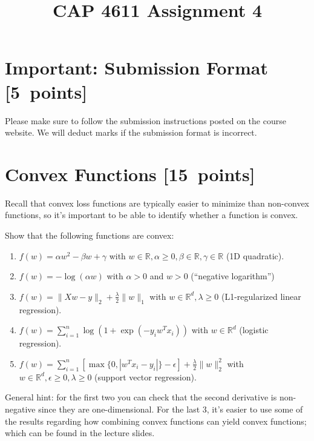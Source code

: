 \documentclass{article}
\newcommand{\blu}[1]{{\textcolor{blu}{#1}}}
\let\ask\blu
\newcommand\pts[1]{\textcolor{pointscolour}{[#1~points]}}
\def\R{\mathbb{R}}
\newcommand{\norm}[1]{\lVert #1 \rVert}
\begin{document}
\title{CAP 4611 Assignment 4}
\date{}
\maketitle

\vspace{-4em}

\section*{Important: Submission Format \pts{5}}

    Please make sure to follow the submission instructions posted on the course website.
    \ask{We will deduct marks if the submission format is incorrect.}

\section{Convex Functions \pts{15}}

Recall that convex loss functions are typically easier to minimize than non-convex functions, so it's important to be able to identify whether a function is convex.

\ask{Show that the following functions are convex}:

\begin{enumerate}
\item $f(w) = \alpha w^2 - \beta w + \gamma$ with $w \in \R, \alpha \geq 0, \beta \in \R, \gamma \in \R$ (1D quadratic).

\item $f(w) = -\log(\alpha w) $ with $\alpha > 0$ and $w > 0$ (``negative logarithm'')

\item $f(w) = \norm{Xw-y}_2 + \frac{\lambda}{2}\norm{w}_1$ with $w \in \R^d, \lambda \geq 0$ (L1-regularized linear regression).

\item $f(w) = \sum_{i=1}^n \log(1+\exp(-y_iw^Tx_i)) $ with $w \in \R^d$ (logistic regression).

\item $f(w) = \sum_{i=1}^n[\max\{0,|w^Tx_i - y_i|\} - \epsilon] + \frac{\lambda}{2}\norm{w}_2^2$  with $w \in \R^d, \epsilon \geq 0, \lambda \geq 0$ (support vector regression).

\end{enumerate}

General hint: for the first two you can check that the second derivative is non-negative since they are one-dimensional. For the last 3, it's easier to use some of the results regarding how combining convex functions can yield convex functions; which can be found in the lecture slides.
\end{document}
